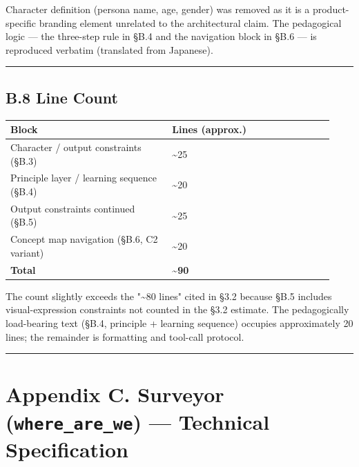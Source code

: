 \documentclass[
]{article}
\newcounter{none} %
\begin{document}
Character definition (persona name, age, gender) was removed as it is a product-specific branding element unrelated to the architectural claim. The pedagogical logic --- the three-step rule in §B.4 and the navigation block in §B.6 --- is reproduced verbatim (translated from Japanese).

\begin{center}\rule{0.5\linewidth}{0.5pt}\end{center}

\subsection{B.8 Line Count}\label{b8-line-count}

{\def\LTcaptype{none} %
\begin{longtable}[]{@{}>{\raggedright\arraybackslash}p{0.465\linewidth}>{\raggedright\arraybackslash}p{0.465\linewidth}@{}}
\toprule\noalign{}
Block & Lines (approx.) \\
\midrule\noalign{}
\endhead
\bottomrule\noalign{}
\endlastfoot
Character / output constraints (§B.3) & \textasciitilde25 \\
Principle layer / learning sequence (§B.4) & \textasciitilde20 \\
Output constraints continued (§B.5) & \textasciitilde25 \\
Concept map navigation (§B.6, C2 variant) & \textasciitilde20 \\
\textbf{Total} & \textbf{\textasciitilde90} \\
\end{longtable}
}

The count slightly exceeds the "\textasciitilde80 lines" cited in §3.2 because §B.5 includes visual-expression constraints not counted in the §3.2 estimate. The pedagogically load-bearing text (§B.4, principle + learning sequence) occupies approximately 20 lines; the remainder is formatting and tool-call protocol.

\begin{center}\rule{0.5\linewidth}{0.5pt}\end{center}

\section{\texorpdfstring{Appendix C. Surveyor (\texttt{where\_are\_we}) --- Technical Specification}{Appendix C. Surveyor (where\_are\_we) --- Technical Specification}}\label{appendix-c-surveyor-where_are_we--technical-specification}
\end{document}

